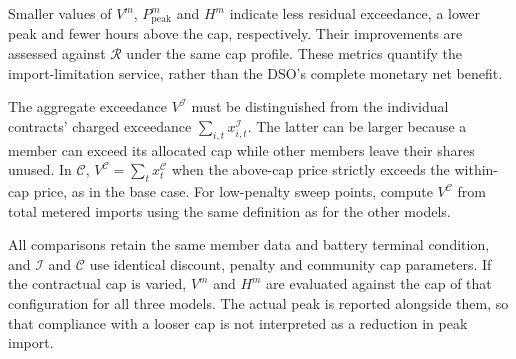 Smaller values of $V^m$, $P_{\mathrm{peak}}^m$ and $H^m$ indicate less
residual exceedance, a lower peak and fewer hours above the cap,
respectively. Their improvements are assessed against $\mathcal R$
under the same cap profile. These metrics quantify the import-limitation
service, rather than the DSO's complete monetary net benefit.

The aggregate exceedance $V^{\mathcal I}$ must be distinguished from
the individual contracts' charged exceedance
$\sum_{i,t}x_{i,t}^{\mathcal I}$. The latter can be larger because a
member can exceed its allocated cap while other members leave their
shares unused. In $\mathcal C$, $V^{\mathcal C}=\sum_t x_t^{\mathcal C}$
when the above-cap price strictly exceeds the within-cap price, as in the
base case. For low-penalty sweep points, compute $V^{\mathcal C}$ from
total metered imports using the same definition as for the other models.

All comparisons retain the same member data and battery terminal condition,
and $\mathcal I$ and $\mathcal C$ use identical discount, penalty and
community cap parameters. If the contractual cap is varied, $V^m$ and
$H^m$ are evaluated against the cap of that configuration for all three
models. The actual peak is reported alongside them, so that compliance
with a looser cap is not interpreted as a reduction in peak import.
